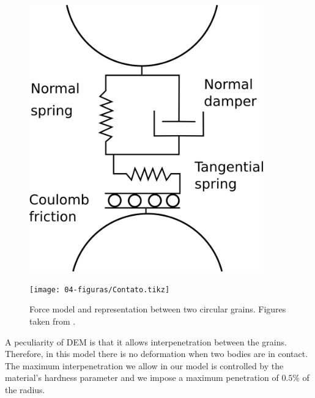\begin{figure}[H]
    \begin{minipage}{.45\linewidth}
        \centering
        \includegraphics[width=0.9\textwidth]{04-figuras/Modelo_Forcas.png}
        \label{fig:forcas_modelo}
    \end{minipage}
    \begin{minipage}{.45\linewidth}
        \centering
        \texttt{[image: 04-figuras/Contato.tikz]}
        \label{fig:forcas_contato}
    \end{minipage}
    \caption[Contact force model.]{Force model and representation between two circular grains. Figures taken from \cite{Sands_Powders_and_Grains}.}
    \label{fig:forcas}
\end{figure}

    A peculiarity of DEM is that it allows interpenetration between the grains. Therefore, in this model there is no deformation when two bodies are in contact. The maximum interpenetration we allow in our model is controlled by the material's hardness parameter and we impose a maximum penetration of $0.5\%$ of the radius.


